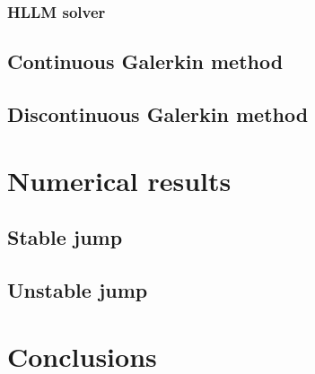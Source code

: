 \documentclass{article}
\begin{document}
\subsubsection{HLLM solver}

\subsection{Continuous Galerkin method}

\subsection{Discontinuous Galerkin method}

\section{Numerical results}

\subsection{Stable jump}

\subsection{Unstable jump}

\section{Conclusions}
\end{document}
